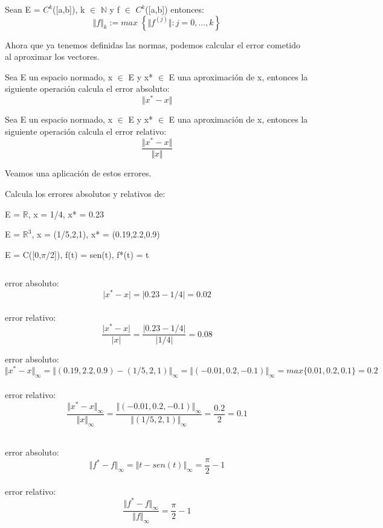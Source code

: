 \begin{ndef}
Sean E = $C^k$([a,b]), k $\in$ $\mathbb{N}$ y f $\in$ $C^k$([a,b]) entonces:
\[ \Vert f \Vert _k := max \; \left\lbrace \Vert f^{(j)} \Vert : j = 0,...,k \right\rbrace \]
\end{ndef}

Ahora que ya tenemos definidas las normas, podemos calcular el error cometido al aproximar los vectores.

\begin{ndef}
Sea E un espacio normado, x $\in$ E y x* $\in$ E una aproximación de x, entonces la siguiente operación calcula el error absoluto:
\[ \Vert x^* - x \Vert \]
\end{ndef}

\begin{ndef}
Sea E un espacio normado, x $\in$ E y x* $\in$ E una aproximación de x, entonces la siguiente operación calcula el error relativo:
\[  \frac {\Vert x^* - x \Vert}{ \Vert x \Vert} \]
\end{ndef}

Veamos una aplicación de estos errores.

\begin{ejer}
Calcula los errores absolutos y relativos de:
	\begin{nlist}
	\item E = $\mathbb{R}$, x = 1/4, x* = 0.23
	\item E = $\mathbb{R}^3$, x = (1/5,2,1), x* = (0.19,2.2,0.9)
	\item E = C([0,$\pi$/2]), f(t) = sen(t), f*(t) = t
	\end{nlist}
\end{ejer}

\begin{sol}
$ $
	\begin{nlist}
	\item error absoluto: $$\vert x^* - x \vert = \vert 0.23 - 1/4 \vert = 0.02 $$\\
	error relativo: $$\frac{\vert x^* - x \vert}{\vert x \vert} = \frac{\vert 0.23 - 1/4 \vert}{\vert 1/4 \vert} = 0.08$$
	\item error absoluto: $$\Vert x^* - x \Vert _\infty = \Vert (0.19,2.2,0.9) - (1/5,2,1) \Vert _\infty = \Vert (-0.01,0.2,-0.1) \Vert _\infty = max \lbrace 0.01,0.2,0.1\rbrace = 0.2 $$\\
	error relativo: $$\frac{\Vert x^* - x \Vert _\infty}{\Vert x \Vert _\infty} = \frac{\Vert (-0.01,0.2,-0.1) \Vert _\infty}{\Vert (1/5,2,1) \Vert _\infty} = \frac{0.2}{2} = 0.1 $$\\
	\item error absoluto: $$\Vert f^* - f \Vert _\infty = \Vert t - sen(t) \Vert _\infty = \frac{\pi}{2} - 1$$\\
	error relativo: $$\frac{\Vert f^* - f \Vert _\infty}{\Vert f \Vert _\infty} = \frac{\pi}{2} - 1 $$
	\end{nlist}
\end{sol}

